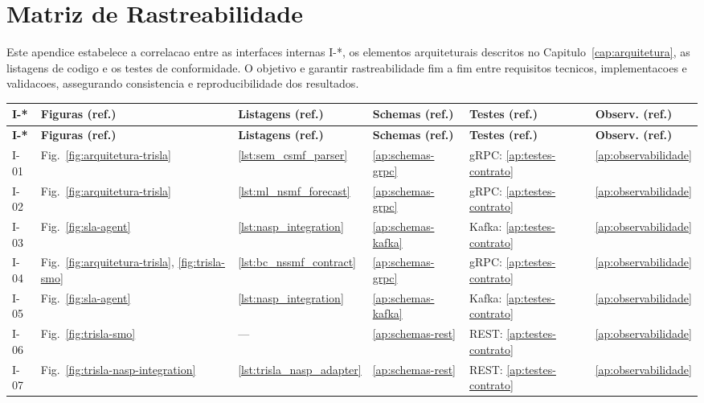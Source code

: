 
\chapter{Matriz de Rastreabilidade}
\label{ap:rastreabilidade}

Este apendice estabelece a correlacao entre as interfaces internas I-*, os elementos arquiteturais descritos no Capitulo~\ref{cap:arquitetura}, as listagens de codigo e os testes de conformidade.  
O objetivo e garantir rastreabilidade fim a fim entre requisitos tecnicos, implementacoes e validacoes, assegurando consistencia e reproducibilidade dos resultados.

{\scriptsize
\setlength{\tabcolsep}{3pt}
\begin{longtable}{L{1.4cm} L{3.0cm} L{4.0cm} L{3.2cm} L{3.2cm} L{3.0cm}}
\toprule
\textbf{I-*} & \textbf{Figuras (ref.)} & \textbf{Listagens (ref.)} & \textbf{Schemas (ref.)} & \textbf{Testes (ref.)} & \textbf{Observ. (ref.)} \\
\midrule
\endfirsthead
\toprule
\textbf{I-*} & \textbf{Figuras (ref.)} & \textbf{Listagens (ref.)} & \textbf{Schemas (ref.)} & \textbf{Testes (ref.)} & \textbf{Observ. (ref.)} \\
\midrule
\endhead

I-01 & Fig.~\ref{fig:arquitetura-trisla} & \ref{lst:sem_csmf_parser} & \ref{ap:schemas-grpc} & gRPC: \ref{ap:testes-contrato} & \ref{ap:observabilidade} \\
I-02 & Fig.~\ref{fig:arquitetura-trisla} & \ref{lst:ml_nsmf_forecast} & \ref{ap:schemas-grpc} & gRPC: \ref{ap:testes-contrato} & \ref{ap:observabilidade} \\
I-03 & Fig.~\ref{fig:sla-agent} & \ref{lst:nasp_integration} & \ref{ap:schemas-kafka} & Kafka: \ref{ap:testes-contrato} & \ref{ap:observabilidade} \\
I-04 & Fig.~\ref{fig:arquitetura-trisla}, \ref{fig:trisla-smo} & \ref{lst:bc_nssmf_contract} & \ref{ap:schemas-grpc} & gRPC: \ref{ap:testes-contrato} & \ref{ap:observabilidade} \\
I-05 & Fig.~\ref{fig:sla-agent} & \ref{lst:nasp_integration} & \ref{ap:schemas-kafka} & Kafka: \ref{ap:testes-contrato} & \ref{ap:observabilidade} \\
I-06 & Fig.~\ref{fig:trisla-smo} & — & \ref{ap:schemas-rest} & REST: \ref{ap:testes-contrato} & \ref{ap:observabilidade} \\
I-07 & Fig.~\ref{fig:trisla-nasp-integration} & \ref{lst:trisla_nasp_adapter} & \ref{ap:schemas-rest} & REST: \ref{ap:testes-contrato} & \ref{ap:observabilidade} \\

\bottomrule
\end{longtable}
}
\FloatBarrier

